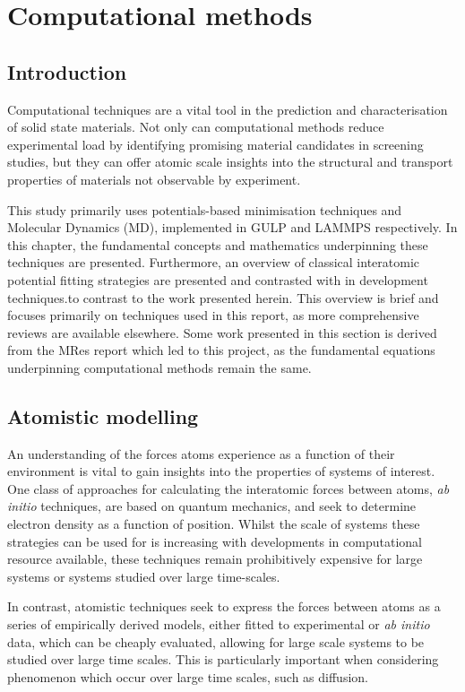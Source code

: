 \chapter{Computational methods}
\section{Introduction} %
Computational techniques are a vital tool in the prediction and characterisation of solid state materials.
Not only can computational methods reduce experimental load by identifying promising material candidates in screening studies, but they can offer atomic scale insights into the structural and transport properties of materials not observable by experiment.

This study primarily uses potentials-based minimisation techniques and Molecular Dynamics (MD), implemented in GULP \cite{Gale2003} and LAMMPS \cite{StevePlimton1995} respectively.
In this chapter, the fundamental concepts and mathematics underpinning these techniques are presented.
Furthermore, an overview of classical interatomic potential fitting strategies are presented and contrasted with in development techniques.to contrast to the work presented herein. %
This overview is brief and focuses primarily on techniques used in this report, as more comprehensive reviews are available elsewhere. \cite{Gale2003, Jensen2007, Catlow2013}
Some work presented in this section is derived from the MRes report which led to this project, as the fundamental equations underpinning computational methods remain the same.

\section{Atomistic modelling}
An understanding of the forces atoms experience as a function of their environment is vital to gain insights into the properties of systems of interest.
One class of approaches for calculating the interatomic forces between atoms, \textit{ab initio} techniques, are based on quantum mechanics, and seek to determine electron density as a function of position. Whilst the scale of systems these strategies can be used for is increasing with developments in computational resource available, these techniques remain prohibitively expensive for large systems or systems studied over large time-scales.

In contrast, atomistic techniques seek to express the forces between atoms as a series of empirically derived models, either fitted to experimental or \textit{ab initio} data, which can be cheaply evaluated, allowing for large scale systems to be studied over large time scales. This is particularly important when considering phenomenon which occur over large time scales, such as diffusion. 


